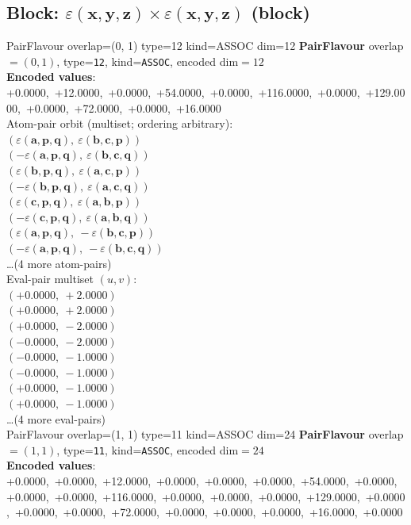 \documentclass[a4paper,11pt]{article}
\newcommand{\kblbmcpggoncpf}[3]{\varepsilon(\mathbf{#1},\mathbf{#2},\mathbf{#3})}
\begin{document}
\subsection{Block: $\kblbmcpggoncpf{x}{y}{z} \times \kblbmcpggoncpf{x}{y}{z}$  (block)}
    PairFlavour  overlap=(0, 1)  type=12  kind=ASSOC  dim=12
\textbf{PairFlavour} overlap$=(0, 1)$, type=\texttt{12}, kind=\texttt{ASSOC}, encoded dim$=12$\\
\textbf{      Encoded values}: +0.0000,\ +12.0000,\ +0.0000,\ +54.0000,\ +0.0000,\ +116.0000,\ +0.0000,\ +129.0000,\ +0.0000,\ +72.0000,\ +0.0000,\ +16.0000\\
\quad Atom-pair orbit (multiset; ordering arbitrary):\\
$(\kblbmcpggoncpf{a}{p}{q},\ \kblbmcpggoncpf{b}{c}{p})$\\
$(-\kblbmcpggoncpf{a}{p}{q},\ \kblbmcpggoncpf{b}{c}{q})$\\
$(\kblbmcpggoncpf{b}{p}{q},\ \kblbmcpggoncpf{a}{c}{p})$\\
$(-\kblbmcpggoncpf{b}{p}{q},\ \kblbmcpggoncpf{a}{c}{q})$\\
$(\kblbmcpggoncpf{c}{p}{q},\ \kblbmcpggoncpf{a}{b}{p})$\\
$(-\kblbmcpggoncpf{c}{p}{q},\ \kblbmcpggoncpf{a}{b}{q})$\\
$(\kblbmcpggoncpf{a}{p}{q},\ -\kblbmcpggoncpf{b}{c}{p})$\\
$(-\kblbmcpggoncpf{a}{p}{q},\ -\kblbmcpggoncpf{b}{c}{q})$\\
\quad \ldots (4 more atom-pairs)\\
\quad Eval-pair multiset $(u, v)$:\\
$(+0.0000,\ +2.0000)$\\
$(+0.0000,\ +2.0000)$\\
$(+0.0000,\ -2.0000)$\\
$(-0.0000,\ -2.0000)$\\
$(-0.0000,\ -1.0000)$\\
$(-0.0000,\ -1.0000)$\\
$(+0.0000,\ -1.0000)$\\
$(+0.0000,\ -1.0000)$\\
\quad \ldots (4 more eval-pairs)\\
    PairFlavour  overlap=(1, 1)  type=11  kind=ASSOC  dim=24
\textbf{PairFlavour} overlap$=(1, 1)$, type=\texttt{11}, kind=\texttt{ASSOC}, encoded dim$=24$\\
\textbf{      Encoded values}: +0.0000,\ +0.0000,\ +12.0000,\ +0.0000,\ +0.0000,\ +0.0000,\ +54.0000,\ +0.0000,\ +0.0000,\ +0.0000,\ +116.0000,\ +0.0000,\ +0.0000,\ +0.0000,\ +129.0000,\ +0.0000,\ +0.0000,\ +0.0000,\ +72.0000,\ +0.0000,\ +0.0000,\ +0.0000,\ +16.0000,\ +0.0000\\
\end{document}
